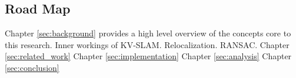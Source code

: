 \subsection{Road Map}

Chapter \ref{sec:background} provides a high level overview of the concepts core to this research. Inner workings of KV-SLAM. Relocalization. RANSAC. 
Chapter \ref{sec:related_work}
Chapter \ref{sec:implementation}
Chapter \ref{sec:analysis}
Chapter \ref{sec:conclusion}